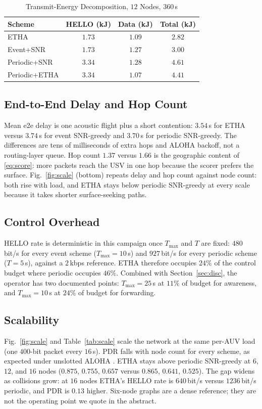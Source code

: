 \documentclass[journal]{IEEEtran}
\begin{document}
\begin{table}[!t]
\caption{Transmit-Energy Decomposition, $12$ Nodes, $360$\,s}
\label{tab:edec}
\centering
\begin{tabular}{lccc}
\toprule
Scheme & HELLO (kJ) & Data (kJ) & Total (kJ) \\
\midrule
ETHA & $1.73$ & $1.09$ & $2.82$ \\
Event+SNR & $1.73$ & $1.27$ & $3.00$ \\
Periodic+SNR & $3.34$ & $1.28$ & $4.61$ \\
Periodic+ETHA & $3.34$ & $1.07$ & $4.41$ \\
\bottomrule
\end{tabular}
\end{table}

\subsection{End-to-End Delay and Hop Count}
Mean e2e delay is one acoustic flight plus a short contention:
$3.54$\,s for ETHA versus $3.74$\,s for event SNR-greedy and
$3.70$\,s for periodic SNR-greedy. The differences are tens of
milliseconds of extra hops and ALOHA backoff, not a routing-layer
queue. Hop count $1.37$ versus $1.66$ is the geographic content of
\eqref{eq:score}: more packets reach the USV in one hop because the
scorer prefers the surface.
Fig.~\ref{fig:scale} (bottom) repeats delay and hop count against
node count: both rise with load, and ETHA stays below periodic
SNR-greedy at every scale because it takes shorter surface-seeking
paths.

\subsection{Control Overhead}
HELLO rate is deterministic in this campaign once $T_{\max}$ and $T$
are fixed: $480$\,bit/s for every event scheme ($T_{\max}=10$\,s) and
$927$\,bit/s for every periodic scheme ($T=5$\,s), against a
$2$\,kbps reference. ETHA therefore occupies $24\%$ of the control
budget where periodic occupies $46\%$. Combined with
Section~\ref{sec:disc}, the operator has two documented points:
$T_{\max}=25$\,s at $11\%$ of budget for awareness, and
$T_{\max}=10$\,s at $24\%$ of budget for forwarding.

\subsection{Scalability}
Fig.~\ref{fig:scale} and Table~\ref{tab:scale} scale the network at
the same per-AUV load (one $400$-bit packet every $16$\,s).
PDR falls with node count for every scheme, as expected under
unslotted ALOHA \cite{casari2011protocol}. ETHA stays above periodic
SNR-greedy at $6$, $12$, and $16$ nodes
($0.875$, $0.755$, $0.657$ versus $0.865$, $0.641$, $0.525$).
The gap widens as collisions grow: at $16$ nodes ETHA's HELLO rate is
$640$\,bit/s versus $1236$\,bit/s periodic, and PDR is $0.13$ higher.
Six-node graphs are a dense reference; they are not the operating
point we quote in the abstract.
\end{document}
